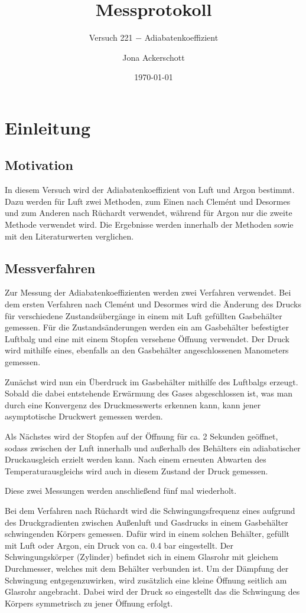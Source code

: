 \documentclass[12pt,a4paper,german]{scrartcl}
\author{Jona Ackerschott}
\title{Messprotokoll}
\subtitle{Versuch 221 $-$ Adiabatenkoeffizient}
\date{\today}
\numberwithin{equation}{section}
\begin{document}
  \maketitle

  \tableofcontents

  \newpage
  \section{Einleitung}
  \subsection{Motivation}
  In diesem Versuch wird der Adiabatenkoeffizient von Luft und Argon bestimmt.
  Dazu werden für Luft zwei Methoden, zum Einen nach Clemént und Desormes und zum Anderen nach Rüchardt verwendet, während für Argon nur die zweite Methode verwendet wird.
  Die Ergebnisse werden innerhalb der Methoden sowie mit den Literaturwerten verglichen.

  \subsection{Messverfahren}
  Zur Messung der Adiabatenkoeffizienten werden zwei Verfahren verwendet.
  Bei dem ersten Verfahren nach Clemént und Desormes wird die Änderung des Drucks für verschiedene Zustandsübergänge in einem mit Luft gefüllten Gasbehälter gemessen.
  Für die Zustandsänderungen werden ein am Gasbehälter befestigter Luftbalg und eine mit einem Stopfen versehene Öffnung verwendet.
  Der Druck wird mithilfe eines, ebenfalls an den Gasbehälter angeschlossenen Manometers gemessen.

  Zunächst wird nun ein Überdruck im Gasbehälter mithilfe des Luftbalgs erzeugt.
  Sobald die dabei entstehende Erwärmung des Gases abgeschlossen ist, was man durch eine Konvergenz des Druckmesswerts erkennen kann, kann jener asymptotische Druckwert gemessen werden.

  Als Nächstes wird der Stopfen auf der Öffnung für ca. 2 Sekunden geöffnet, sodass zwischen der Luft innerhalb und außerhalb des Behälters ein adiabatischer Druckausgleich erzielt werden kann. Nach einem erneuten Abwarten des Temperaturausgleichs wird auch in diesem Zustand der Druck gemessen.

  Diese zwei Messungen werden anschließend fünf mal wiederholt.

  Bei dem Verfahren nach Rüchardt wird die Schwingungsfrequenz eines aufgrund des Druckgradienten zwischen Außenluft und Gasdrucks in einem Gasbehälter schwingenden Körpers gemessen.
  Dafür wird in einem solchen Behälter, gefüllt mit Luft oder Argon, ein Druck von ca. 0.4 bar eingestellt.
  Der Schwingungskörper (Zylinder) befindet sich in einem Glasrohr mit gleichem Durchmesser, welches mit dem Behälter verbunden ist.
  Um der Dämpfung der Schwingung entgegenzuwirken, wird zusätzlich eine kleine Öffnung seitlich am Glasrohr angebracht.
  Dabei wird der Druck so eingestellt das die Schwingung des Körpers symmetrisch zu jener Öffnung erfolgt.
\end{document}
